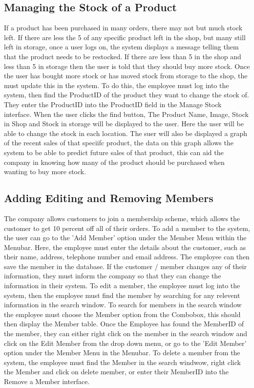 \subsection{Managing the Stock of a Product}

If a product has been purchased in many orders, there may not but much stock left. If there are less the 5 of any specific product left in the shop, but many still left in storage, once a user logs on, the system displays a message telling them that the product needs to be restocked. If there are less than 5 in the shop and less than 5 in storage then the user is told that they should buy more stock. Once the user has bought more stock or has moved stock from storage to the shop, the must update this in the system. To do this, the employee must log into the system, then find the ProductID of the product they want to change the stock of. They enter the ProductID into the ProductID field in the Manage Stock interface. When the user clicks the find button, The Product Name, Image, Stock in Shop and Stock in storage will be displayed to the user. Here the user will be able to change the stock in each location. The suer will also be displayed a graph of the recent sales of that speciifc product, the data on this graph allows the system to be able to predict future sales of that product, this can aid the company in knowing how many of the product should be purchased when wanting to buy more stock.

\subsection{Adding Editing and Removing Members}
The company allows customers to join a membership scheme, which allows the customer to get 10 percent off all of their orders. To add a member to the system, the user can go to the 'Add Member' option under the Member Menu within the Menubar. Here, the employee must enter the details about the customer, such as their name, address, telephone number and email address. The employee can then save the member in the database. If the customer / member changes any of their information, they must inform the company so that they can change the information in their system. To edit a member, the employee must log into the system, then the employee must find the member by searching for any relevent information in the search window. To search for members in the search window the employee must choose the Member option from the Combobox, this should then display the Member table. Once the Employee has found the MemberID of the member, they can either right click on the member in the search window and click on the Edit Member from the drop down menu, or go to the 'Edit Member' option under the Member Menu in the Menubar. To delete a member from the system, the employee must find the Member in the search windwow, right click the Member and click on delete member, or enter their MemberID into the Remove a Member interface.

